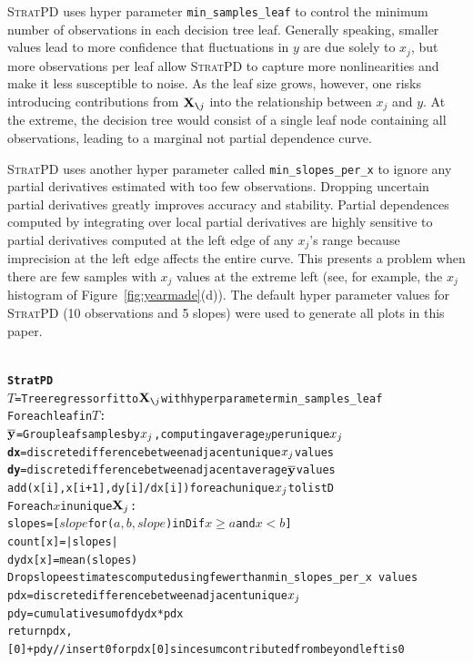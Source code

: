 \documentclass{article}
\newcommand{\figref}[1]{Figure~\ref{#1}}
\newcommand{\spd}{\fontfamily{cmr}\textsc{\small StratPD}}
\newcommand{\xnj}{${\bf X}_{\texttt{\char`\\}j}$}
\begin{document}
\spd{} uses hyper parameter {\tt\small min\_samples\_leaf} to control the minimum number of observations in each decision tree leaf.  Generally speaking, smaller values lead to more confidence that fluctuations in $y$ are due solely to $x_j$, but more observations per leaf allow \spd{} to capture more nonlinearities and make it less susceptible to noise.  As the leaf size grows, however, one risks introducing contributions from \xnj{} into the relationship between $x_j$ and $y$. At the extreme, the decision tree would consist of a single leaf node containing all observations, leading to a marginal not partial dependence curve.

\spd{} uses another hyper parameter called {\tt\small min\_slopes\_per\_x} to ignore any partial derivatives estimated with too few observations.  Dropping uncertain partial derivatives greatly improves accuracy and stability. Partial dependences computed by integrating over local partial derivatives are highly sensitive to partial derivatives computed at the left edge of any $x_j$'s range because imprecision at the left edge affects the entire curve.  This presents a problem when there are few samples with $x_j$ values at the extreme left (see, for example, the $x_j$ histogram of \figref{fig:yearmade}(d)). The default hyper parameter values for \spd{} (10 observations and 5 slopes) were used to generate all plots in this paper.

\begin{alltt}
{\selectfont\small
{\bf{}StratPD}
\(T\) = Tree regressor fit to \xnj with hyper parameter {\tt{}min_samples_leaf}
For each leaf in \(T\):
    \(\bf\overline{y}\) = Group leaf samples by \(x\sb{j}\), computing average \(y\) per unique \(x\sb{j}\)
    {\bf{}dx} = discrete difference between adjacent unique \(x\sb{j}\) values
    {\bf{}dy} = discrete difference between adjacent average \(\bf\overline{y}\) values
    add (x[i], x[i+1], dy[i]/dx[i]) for each unique \(x\sb{j}\) to list D
For each \(x\) in unique \({\bf{}X}\sb{j}\):
    slopes = [\(slope\) for (\(a, b, slope\)) in D if \(x \ge a\) and \(x < b\)]
    count[x] = |slopes|
    dydx[x] = mean(slopes)
Drop slope estimates computed using fewer than {\tt{}min_slopes_per_x values}
pdx = discrete difference between adjacent unique \(x\sb{j}\)
pdy = cumulative sum of dydx * pdx
return pdx, [0]+pdy  // insert 0 for pdx[0] since sum contributed from beyond left is 0
}
\end{alltt}
\end{document}
